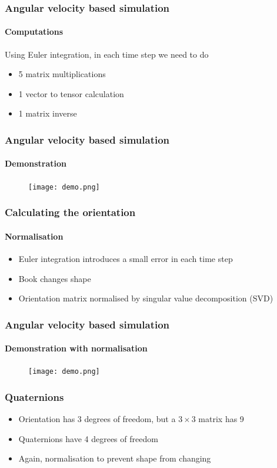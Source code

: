 \documentclass{beamer}
\begin{document}
\begin{frame}
 \frametitle{Angular velocity based simulation}
 \framesubtitle{Computations}
 Using Euler integration, in each time step we need to do
 \begin{itemize}
  \item 5 matrix multiplications
  \item 1 vector to tensor calculation
  \item 1 matrix inverse
 \end{itemize}
\end{frame}

\begin{frame}
 \frametitle{Angular velocity based simulation}
 \framesubtitle{Demonstration}
 \begin{figure}
  \centering
  \texttt{[image: demo.png]}
 \end{figure}
\end{frame}

\begin{frame}
 \frametitle{Calculating the orientation} 
 \framesubtitle{Normalisation}
 \begin{itemize}
  \item Euler integration introduces a small error in each time step
  \item Book changes shape
  \item Orientation matrix normalised by singular value decomposition (SVD)
 \end{itemize}
\end{frame}

\begin{frame}
 \frametitle{Angular velocity based simulation}
 \framesubtitle{Demonstration with normalisation}
 \begin{figure}
  \centering
  \texttt{[image: demo.png]}
 \end{figure}
\end{frame}

\begin{frame}
 \frametitle{Quaternions} 
 \begin{itemize}
  \item Orientation has 3 degrees of freedom, but a $3\times3$ matrix has 9
  \item Quaternions have 4 degrees of freedom
  \item Again, normalisation to prevent shape from changing
 \end{itemize}
\end{frame}
\end{document}
